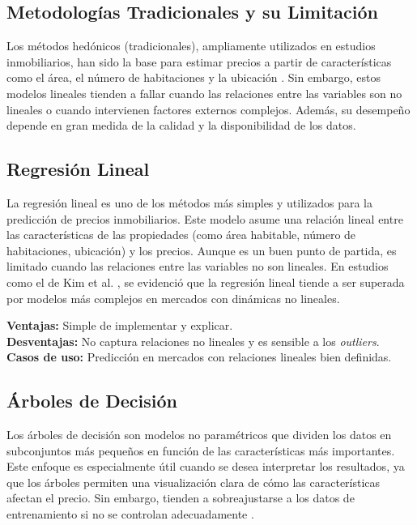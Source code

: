 \subsection{Metodologías Tradicionales y su Limitación}
Los métodos hedónicos (tradicionales), ampliamente utilizados en estudios inmobiliarios, han sido la base para estimar precios a partir de características como el área, el número de habitaciones y la ubicación \cite{kim2018machinelearning}. Sin embargo, estos modelos lineales tienden a fallar cuando las relaciones entre las variables son no lineales o cuando intervienen factores externos complejos. Además, su desempeño depende en gran medida de la calidad y la disponibilidad de los datos.


\subsection*{Regresión Lineal}
La regresión lineal es uno de los métodos más simples y utilizados para la predicción de precios inmobiliarios. Este modelo asume una relación lineal entre las características de las propiedades (como área habitable, número de habitaciones, ubicación) y los precios. Aunque es un buen punto de partida, es limitado cuando las relaciones entre las variables no son lineales. En estudios como el de Kim et al. \cite{kim2018machinelearning}, se evidenció que la regresión lineal tiende a ser superada por modelos más complejos en mercados con dinámicas no lineales.

\textbf{Ventajas:} Simple de implementar y explicar.\\
\textbf{Desventajas:} No captura relaciones no lineales y es sensible a los \textit{outliers}.\\
\textbf{Casos de uso:} Predicción en mercados con relaciones lineales bien definidas.

\subsection*{Árboles de Decisión}
Los árboles de decisión son modelos no paramétricos que dividen los datos en subconjuntos más pequeños en función de las características más importantes. Este enfoque es especialmente útil cuando se desea interpretar los resultados, ya que los árboles permiten una visualización clara de cómo las características afectan el precio. Sin embargo, tienden a sobreajustarse a los datos de entrenamiento si no se controlan adecuadamente \cite{kim2018machinelearning}.

